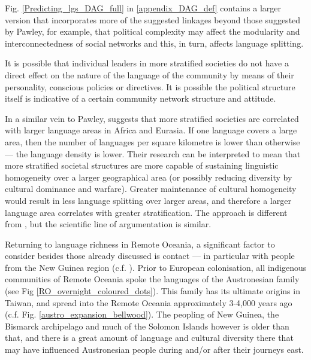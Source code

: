 \documentclass[unnumsec,webpdf,modern,medium]{oup-authoring-template}
\begin{document}
Fig. \ref{Predicting_lgs_DAG_full} in \ref{appendix_DAG_def} contains a larger version that incorporates more of the suggested linkages beyond those suggested by Pawley, for example, that political complexity may affect the modularity and interconnectedness of social networks and this, in turn, affects language splitting. 

It is possible that individual leaders in more stratified societies do not have a direct effect on the nature of the language of the community by means of their personality, conscious policies or directives. It is possible the political structure itself is indicative of a certain community network structure and attitude.

In a similar vein to Pawley, \citet{curriemace2009} suggests that more stratified societies are correlated with larger language areas in Africa and Eurasia. If one language covers a large area, then the number of languages per square kilometre is lower than otherwise --- the language density is lower. Their research can be interpreted to mean that more stratified societal structures are more capable of sustaining linguistic homogeneity over a larger geographical area (or possibly reducing diversity by cultural dominance and warfare). Greater maintenance of cultural homogeneity would result in less language splitting over larger areas, and therefore a larger language area correlates with greater stratification. The approach is different from \citet{pawley81, pawley2007}, but the scientific line of argumentation is similar.


Returning to language richness in Remote Oceania, a significant factor to consider besides those already discussed is contact --- in particular with people from the New Guinea region (c.f. \citet{ross2017_new_guinea_region}). Prior to European colonisation, all indigenous communities of Remote Oceania spoke the languages of the Austronesian family (see Fig \ref{RO_overnight_coloured_dots}). This family has its ultimate origins in Taiwan, and spread into the Remote Oceania approximately 3-4,000 years ago (c.f. Fig. \ref{austro_expansion_bellwood}). The peopling of New Guinea, the Bismarck archipelago and much of the Solomon Islands however is older than that, and there is a great amount of language and cultural diversity there that may have influenced Austronesian people during and/or after their journeys east. 
\end{document}

